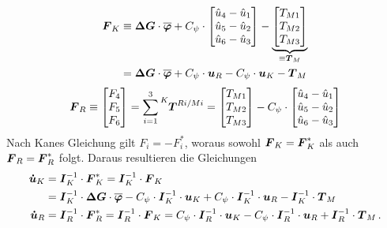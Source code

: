 \begin{equation}
\begin{split}
\boldsymbol{F}_K &\equiv \boldsymbol{\Delta G}\cdot \overline{\boldsymbol{\varphi}} + C_{\psi}\cdot \begin{bmatrix}
\hat{u}_4 - \hat{u}_1 \\ \hat{u}_5 - \hat{u}_2 \\ \hat{u}_6 - \hat{u}_3
\end{bmatrix} - \underbrace{\begin{bmatrix}
T_{M1} \\ T_{M2} \\ T_{M3}
\end{bmatrix}}_{\equiv \boldsymbol{T}_M}
\\
&= \boldsymbol{\Delta G}\cdot \overline{\boldsymbol{\varphi}} + C_{\psi} \cdot \boldsymbol{u}_R - C_{\psi} \cdot \boldsymbol{u}_K  - \boldsymbol{T}_M
\end{split}
\end{equation}
\begin{equation}
\bs{F}_R \equiv \begin{bmatrix} F_4 \\ F_5 \\ F_6 \end{bmatrix} = \sum^3_{i=1} \presuper{K}{\bs{T}^{Ri/Mi}} = \begin{bmatrix}
T_{M1} \\ T_{M2} \\ T_{M3}
\end{bmatrix} - C_{\psi}\cdot \begin{bmatrix}
\hat{u}_4 - \hat{u}_1 \\ \hat{u}_5 - \hat{u}_2 \\ \hat{u}_6 - \hat{u}_3
\end{bmatrix}
\end{equation}
Nach Kanes Gleichung gilt $F_i=-F^*_i$, woraus sowohl $\boldsymbol{F}_K=\boldsymbol{F}^*_K$ als auch $\boldsymbol{F}_R=\boldsymbol{F}^*_R$ folgt. Daraus resultieren die Gleichungen
\begin{align}
\label{eq_ZRD3D_zeile2}
\boldsymbol{\dot{u}}_K &= \boldsymbol{I}^{-1}_K \cdot \boldsymbol{F}^*_K = \boldsymbol{I}^{-1}_K \cdot \boldsymbol{F}_K 
\\
&= \boldsymbol{I}^{-1}_K \cdot \boldsymbol{\Delta G} \cdot \boldsymbol{\overline{\varphi}} - C_{\psi}\cdot \boldsymbol{I}^{-1}_K \cdot \boldsymbol{u}_K + C_{\psi}\cdot \boldsymbol{I}^{-1}_K \cdot \boldsymbol{u}_R - \boldsymbol{I}^{-1}_K \cdot \boldsymbol{T}_M \nonumber
\\
\label{eq_ZRD3D_zeile3}
\boldsymbol{\dot{u}}_R &= \boldsymbol{I}^{-1}_R \cdot \boldsymbol{F}^*_R = \boldsymbol{I}^{-1}_R \cdot \boldsymbol{F}_K =
 C_{\psi}\cdot \boldsymbol{I}^{-1}_R \cdot \boldsymbol{u}_K - C_{\psi}\cdot \boldsymbol{I}^{-1}_R \cdot \boldsymbol{u}_R + \boldsymbol{I}^{-1}_R \cdot \boldsymbol{T}_M \,.
\end{align}
